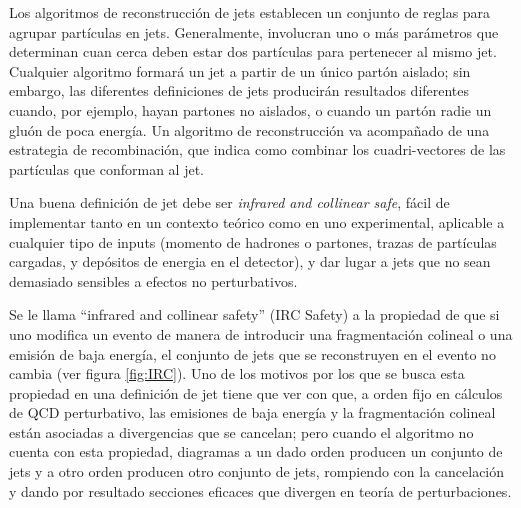 Los algoritmos de reconstrucción de jets establecen un conjunto de reglas para agrupar partículas en jets. Generalmente, involucran uno o más parámetros que determinan cuan cerca deben estar dos partículas para pertenecer al mismo jet. Cualquier algoritmo formará un jet a partir de un único partón aislado; sin embargo, las diferentes definiciones de jets producirán resultados diferentes cuando, por ejemplo, hayan partones no aislados, o cuando un partón radie un gluón de poca energía. Un algoritmo de reconstrucción va acompañado de una estrategia de recombinación, que indica como combinar los cuadri-vectores de las partículas que conforman al jet. 

Una buena definición de jet debe ser \textit{infrared and collinear safe}, fácil de implementar tanto en un contexto teórico como en uno experimental, aplicable a cualquier tipo de inputs (momento de hadrones o partones, trazas de partículas cargadas, y depósitos de energia en el detector), y dar lugar a jets que no sean demasiado sensibles a efectos no perturbativos\cite{ParticleDataGroup}. 

Se le llama ``infrared and collinear safety'' (IRC Safety) a la propiedad de que si uno modifica un evento de manera de introducir una fragmentación colineal o una emisión de baja energía, el conjunto de jets que se reconstruyen en el evento no cambia (ver figura \ref{fig:IRC}). Uno de los motivos por los que se busca esta propiedad en una definición de jet tiene que ver con que, a orden fijo en cálculos de QCD perturbativo, las emisiones de baja energía y la fragmentación colineal están asociadas a divergencias que se cancelan; pero cuando el algoritmo no cuenta con esta propiedad, diagramas a un dado orden producen un conjunto de jets y a otro orden producen otro conjunto de jets, rompiendo con la cancelación y dando por resultado secciones eficaces que divergen en teoría de perturbaciones\cite{Jetography}\cite{RunIIJet}. 

